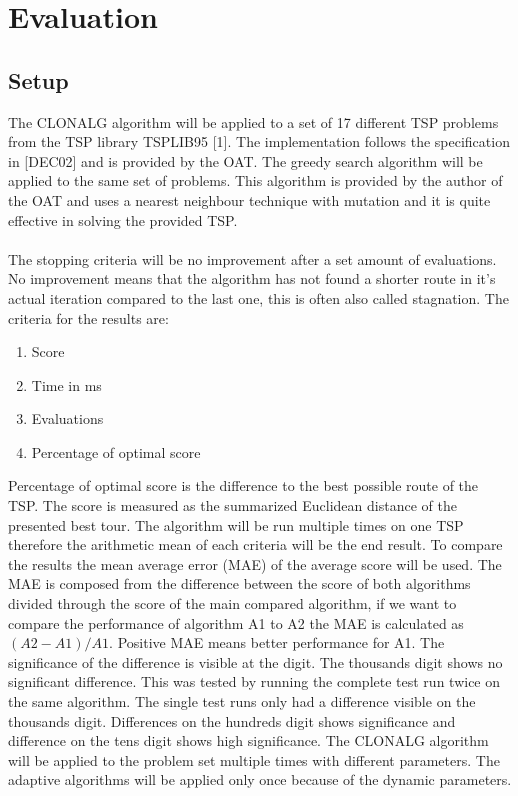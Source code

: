 \chapter{Evaluation}
\label{chap:eva}
\section{Setup}
The CLONALG algorithm will be applied to a set of 17 different TSP problems from the TSP library TSPLIB95 [1]. The implementation follows the specification in [DEC02] and is provided by the OAT. The greedy search algorithm will be applied to the same set of problems. This algorithm is provided by the author of the OAT and uses a nearest neighbour technique with mutation and it is quite effective in solving the provided TSP.\\\\ 
The stopping criteria will be no improvement after a set amount of evaluations. No improvement means that the algorithm has not found a shorter route in it's actual iteration compared to the last one, this is often also called stagnation. 
The criteria for the results are:
\begin{enumerate}
	\item 	Score
	\item 	Time in ms
	\item 	Evaluations	
	\item  	Percentage of optimal score
\end{enumerate}
Percentage of optimal score is the difference to the best possible route of the TSP. The score is measured as the summarized Euclidean distance of the presented best tour. The algorithm will be run multiple times on one TSP therefore the arithmetic mean of each criteria will be the end result. To compare the results the mean average error (MAE) of the average score will be used. The MAE is composed from the difference between the score of both algorithms divided through the score of the main compared algorithm, if we want to compare the performance of algorithm A1 to A2 the MAE is calculated as $(A2-A1)/A1$. Positive MAE means better performance for A1. The significance of the difference is visible at the digit. The thousands digit shows no significant difference. This was tested by running the complete test run twice on the same algorithm. The single test runs only had a difference visible on the thousands digit. Differences on the hundreds digit shows significance and difference on the tens digit shows high significance. The CLONALG algorithm will be applied to the problem set multiple times with different parameters. The adaptive algorithms will be applied only once because of the dynamic parameters.
